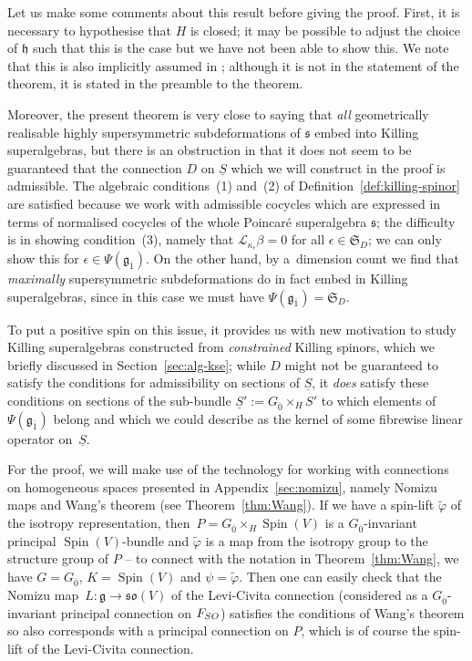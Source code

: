 \documentclass[11pt]{article}
\numberwithin{equation}{section}
\numberwithin{equation}{section}
\newcommand{\fg}{\mathfrak{g}}
\newcommand{\fh}{\mathfrak{h}}
\newcommand{\fs}{\mathfrak{s}}
\newcommand{\fso}{\mathfrak{so}}
\newcommand{\fS}{\mathfrak{S}}
\newcommand{\eL}{\mathscr{L}}
\newcommand{\Sbundle}{\underline{S}}
\newcommand{\1}{\mathbbm{1}}
\DeclareMathOperator{\Spin}{Spin}
\begin{document}
\begin{Remark}
	Let us make some comments about this result before giving the proof. First, it is necessary to hypothesise that $H$ is closed; it may be possible to adjust the choice of $\fh$ such that this is the case but we have not been able to show this. We note that this is also implicitly assumed in \cite[Theorem~13]{Figueroa-OFarrill2017_1}; although it is not in the statement of the theorem, it is stated in the preamble to the theorem.
	
	Moreover, the present theorem is very close to saying that \emph{all} geometrically realisable highly supersymmetric subdeformations of $\fs$ embed into Killing superalgebras, but there is an obstruction in that it does not seem to be guaranteed that the connection $D$ on $\Sbundle$ which we will construct in the proof is admissible. The algebraic conditions~(1) and~(2) of Definition~\ref{def:killing-spinor} are satisfied because we work with admissible cocycles which are expressed in terms of normalised cocycles of the whole Poincar\'e superalgebra $\fs$; the difficulty is in showing condition~(3), namely that $\eL_{\kappa_\epsilon}\beta=0$ for all $\epsilon\in\fS_D$; we can only show this for $\epsilon\in\Psi(\fg_{\overline 1})$. On the other hand, by a~dimension count we find that \emph{maximally} supersymmetric subdeformations do in fact embed in Killing superalgebras, since in this case we must have $\Psi(\fg_{\overline 1})=\fS_D$.
	
	To put a positive spin on this issue, it provides us with new motivation to study Killing superalgebras constructed from \emph{constrained} Killing spinors, which we briefly discussed in Section~\ref{sec:alg-kse}; while $D$ might not be guaranteed to satisfy the conditions for admissibility on sections of $\Sbundle$, it \emph{does} satisfy these conditions on sections of the sub-bundle $\Sbundle':=G_{\overline0}\times_H S'$ to which elements of~$\Psi(\fg_{\overline 1})$ belong and which we could describe as the kernel of some fibrewise linear operator on~$\Sbundle$.
\end{Remark}

For the proof, we will make use of the technology for working with connections on homogeneous spaces presented in Appendix~\ref{sec:nomizu}, namely Nomizu maps and Wang's theorem (see Theorem~\ref{thm:Wang}). If we have a spin-lift $\tilde\varphi$ of the isotropy representation, then~${P=G_{\overline0}\times_H\Spin(V)}$ is a $G_{\overline0}$-invariant principal $\Spin(V)$-bundle and $\tilde\varphi$ is a map from the isotropy group to the structure group of $P$ -- to connect with the notation in Theorem~\ref{thm:Wang}, we have $G=G_{\overline 0}$, $K=\Spin(V)$ and $\psi=\tilde\varphi$. Then one can easily check that the Nomizu map~${L\colon \fg\to\fso(V)}$ of the Levi-Civita connection (considered as a $G_{\overline0}$-invariant principal connection on $F_{\rm SO}$) satisfies the conditions of Wang's theorem so also corresponds with a principal connection on $P$, which is of course the spin-lift of the Levi-Civita connection.
\end{document}
